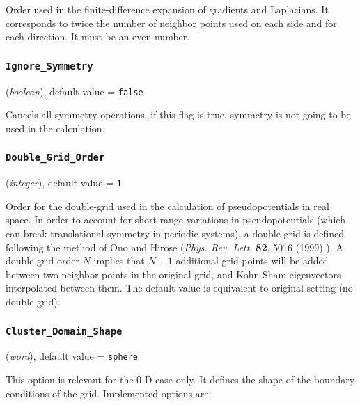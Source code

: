 \documentclass{article}
\begin{document}
Order used in the finite-difference expansion of gradients and Laplacians. It
corresponds to twice the number of neighbor points used on each side and for
each direction. It must be an even number.

\subsubsection{\tt Ignore\_Symmetry 
\label{IgnoreSymmetry}}
({\it boolean}),
default value = {\tt false}

Cancels all symmetry operations. if this flag is true, symmetry is not going 
to be used in the calculation. 

\subsubsection{\tt Double\_Grid\_Order 
\label{DoubleGridOrder}}
({\it integer}),
default value = {\tt 1 }

Order for the double-grid used in the calculation of pseudopotentials
in real space. In order to account for short-range variations in
pseudopotentials (which can break translational symmetry in periodic
systems), a double grid is defined following the method of Ono and
Hirose ({\it Phys. Rev. Lett.} {\bf 82}, 5016 (1999) ). A double-grid
order $N$ implies that $N-1$ additional grid points will be added
between two neighbor points in the original grid, and Kohn-Sham
eigenvectors interpolated between them. The default value is
equivalent to original setting (no double grid).

\subsubsection{\tt Cluster\_Domain\_Shape
\label{ClusterDomainShape}}
({\it word}),
default value = {\tt sphere}

This option is relevant for the 0-D case only. It defines the shape of
the boundary conditions of the grid. Implemented options are:
\end{document}

